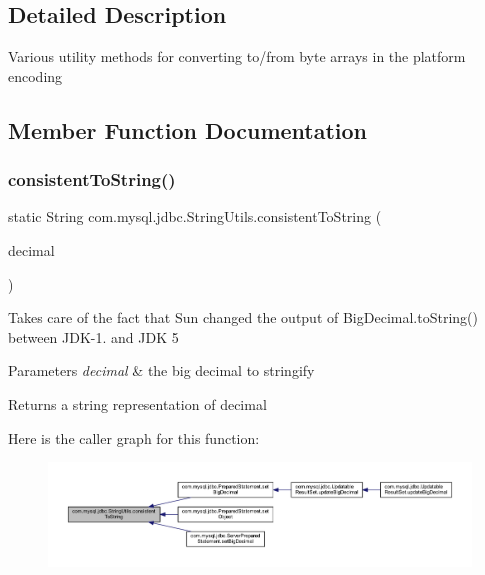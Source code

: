 \subsection{Detailed Description}
Various utility methods for converting to/from byte arrays in the platform encoding 

\subsection{Member Function Documentation}
\mbox{\label{classcom_1_1mysql_1_1jdbc_1_1_string_utils_acb1c38dccd1d027f74d9098be91229df}} 
\subsubsection{\texorpdfstring{consistent\+To\+String()}{consistentToString()}}
{\footnotesize\ttfamily static String com.\+mysql.\+jdbc.\+String\+Utils.\+consistent\+To\+String (\begin{DoxyParamCaption}\item[{Big\+Decimal}]{decimal }\end{DoxyParamCaption})\hspace{0.3cm}{\ttfamily [static]}}

Takes care of the fact that Sun changed the output of Big\+Decimal.\+to\+String() between J\+D\+K-\/1. and J\+DK 5


\begin{DoxyParams}{Parameters}
{\em decimal} & the big decimal to stringify\\
\hline
\end{DoxyParams}
\begin{DoxyReturn}{Returns}
a string representation of \textquotesingle{}decimal\textquotesingle{} 
\end{DoxyReturn}
Here is the caller graph for this function\+:
\nopagebreak
\begin{figure}[H]
\begin{center}
\leavevmode
\includegraphics[width=350pt]{classcom_1_1mysql_1_1jdbc_1_1_string_utils_acb1c38dccd1d027f74d9098be91229df_icgraph}
\end{center}
\end{figure}
\mbox{\label{classcom_1_1mysql_1_1jdbc_1_1_string_utils_ae709b9204f54ce98657cd4133619961b}} 
